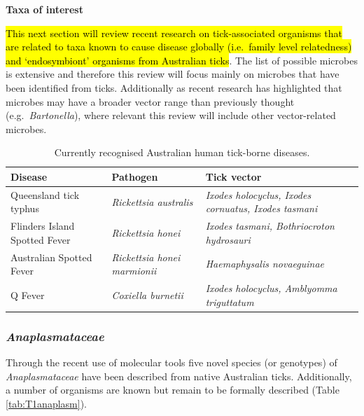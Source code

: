 \documentclass[a4paper, nobind]{templates/ociamthesis}
\begin{document}
\newpage

\textbf{Taxa of interest}

\hl{This next section will review recent research on tick-associated organisms that are related to taxa known to cause disease globally (i.e.~family level relatedness) and `endosymbiont' organisms from Australian ticks}.
The list of possible microbes is extensive and therefore this review will focus mainly on microbes that have been identified from ticks.
Additionally as recent research has highlighted that microbes may have a broader vector range than previously thought (e.g.~\emph{Bartonella}), where relevant this review will include other vector-related microbes.

\begin{table}

\caption[Australian human tick-borne diseases.]{\label{tab:T1ausTBD}Currently recognised Australian human tick-borne diseases.}
\centering
\fontsize{8.5}{10.5}\selectfont
\begin{tabular}[t]{l>{}l>{}l}
\toprule
Disease & Pathogen & Tick vector\\
\midrule
Queensland tick typhus & \em{Rickettsia australis} & \em{Ixodes holocyclus, Ixodes cornuatus, Ixodes tasmani}\\
Flinders Island Spotted Fever & \em{Rickettsia honei} & \em{Ixodes tasmani, Bothriocroton hydrosauri}\\
Australian Spotted Fever & \em{Rickettsia honei marmionii} & \em{Haemaphysalis novaeguinae}\\
Q Fever & \em{Coxiella burnetii} & \em{Ixodes holocyclus, Amblyomma triguttatum}\\
\bottomrule
\end{tabular}
\end{table}

\hypertarget{anaplasmataceae-1}{%
\subsubsection{\texorpdfstring{\emph{Anaplasmataceae}}{Anaplasmataceae}}\label{anaplasmataceae-1}}

Through the recent use of molecular tools five novel species (or genotypes) of \emph{Anaplasmataceae} have been described from native Australian ticks.
Additionally, a number of organisms are known but remain to be formally described (Table \ref{tab:T1anaplasm}).
\end{document}
